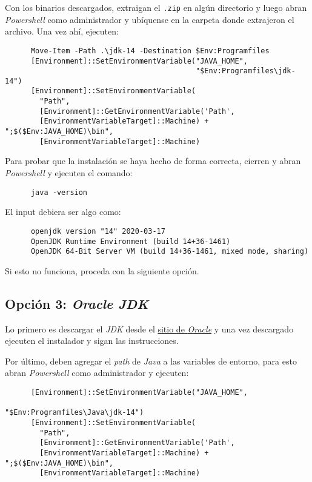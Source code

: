     Con los binarios descargados, extraigan el \texttt{.zip} en algún directorio y luego 
    abran \textit{Powershell} como administrador y ubíquense en la carpeta donde 
    extrajeron el archivo.
    Una vez ahí, ejecuten:

    \begin{verbatim}
      Move-Item -Path .\jdk-14 -Destination $Env:Programfiles
      [Environment]::SetEnvironmentVariable("JAVA_HOME", 
                                            "$Env:Programfiles\jdk-14")
      [Environment]::SetEnvironmentVariable(
        "Path", 
        [Environment]::GetEnvironmentVariable('Path', 
        [EnvironmentVariableTarget]::Machine) + ";$($Env:JAVA_HOME)\bin", 
        [EnvironmentVariableTarget]::Machine)
    \end{verbatim}

    Para probar que la instalación se haya hecho de forma correcta, cierren y abran 
    \textit{Powershell} y ejecuten el comando:

    \begin{verbatim}
      java -version
    \end{verbatim}

    El input debiera ser algo como:

    \begin{verbatim}
      openjdk version "14" 2020-03-17
      OpenJDK Runtime Environment (build 14+36-1461)
      OpenJDK 64-Bit Server VM (build 14+36-1461, mixed mode, sharing)
    \end{verbatim}

    Si esto no funciona, proceda con la siguiente opción.

  \subsection{Opción 3: \textit{Oracle JDK}}
    Lo primero es descargar el \textit{JDK} desde el 
    \href{
      https://www.oracle.com/java/technologies/javase-jdk14-downloads.html
    }{sitio de \textit{Oracle}} y una vez descargado ejecuten el instalador y sigan las 
    instrucciones.

    Por último, deben agregar el \textit{path} de \textit{Java} a las variables de 
    entorno, para esto abran \textit{Powershell} como administrador y ejecuten:

    \begin{verbatim}
      [Environment]::SetEnvironmentVariable("JAVA_HOME", 
                                            "$Env:Programfiles\Java\jdk-14")
      [Environment]::SetEnvironmentVariable(
        "Path", 
        [Environment]::GetEnvironmentVariable('Path', 
        [EnvironmentVariableTarget]::Machine) + ";$($Env:JAVA_HOME)\bin", 
        [EnvironmentVariableTarget]::Machine)
    \end{verbatim}

